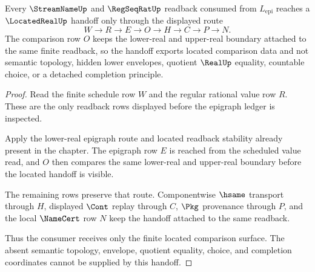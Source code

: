 \begin{theorem}
\label{thm:lowersemicontinuous-root-regular-readback-handoff}
Every $\StreamNameUp$ and $\RegSeqRatUp$ readback consumed from $L_{\mathrm{epi}}$ reaches a $\LocatedRealUp$ handoff only through the displayed route
$$
W \longrightarrow R \longrightarrow E \longrightarrow O \longrightarrow H \longrightarrow C \longrightarrow P \longrightarrow N .
$$
The comparison row $O$ keeps the lower-real and upper-real boundary attached to the same finite readback, so the handoff exports located comparison data and not semantic topology, hidden lower envelopes, quotient $\RealUp$ equality, countable choice, or a detached completion principle.
\end{theorem}
\begin{proof}
Read the finite schedule row $W$ and the regular rational value row $R$. These are the only readback rows displayed before the epigraph ledger is inspected.

Apply the lower-real epigraph route and located readback stability already present in the chapter. The epigraph row $E$ is reached from the scheduled value read, and $O$ then compares the same lower-real and upper-real boundary before the located handoff is visible.

The remaining rows preserve that route. Componentwise $\hsame$ transport through $H$, displayed $\Cont$ replay through $C$, $\Pkg$ provenance through $P$, and the local $\NameCert$ row $N$ keep the handoff attached to the same readback.

Thus the consumer receives only the finite located comparison surface. The absent semantic topology, envelope, quotient equality, choice, and completion coordinates cannot be supplied by this handoff.
\end{proof}

